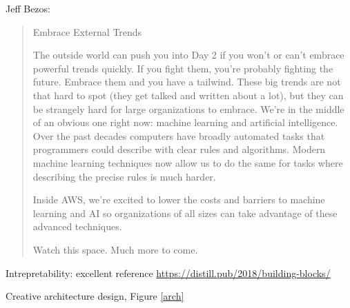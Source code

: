 \documentclass[english]{article}
\begin{document}
Jeff Bezos:

\begin{quote}
Embrace External Trends

The outside world can push you into Day 2 if you won’t or can’t embrace powerful trends quickly. If you fight them, you’re probably fighting the future.
Embrace them and you have a tailwind.
These big trends are not that hard to spot (they get talked and written about a lot), but they can be strangely hard for large organizations to embrace. We’re in
the middle of an obvious one right now: machine learning and artificial intelligence.
Over the past decades computers have broadly automated tasks that programmers could describe with clear rules and algorithms. Modern machine learning
techniques now allow us to do the same for tasks where describing the precise rules is much harder.


Inside AWS, we’re excited to lower the costs and barriers to machine learning and AI so organizations of all sizes can take advantage of these advanced techniques.

Watch this space. Much more to come.
\end{quote}



\item Intrepretability: excellent reference \url{https://distill.pub/2018/building-blocks/}

\item Creative architecture design, Figure \ref{arch}
\end{document}
